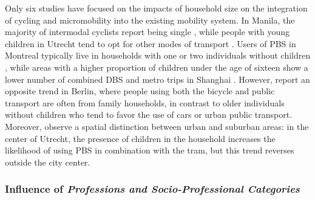 \begin{refsegment}
Only six studies have focused on the impacts of household size on the integration of cycling and micromobility into the existing mobility system. In Manila, the majority of intermodal cyclists report being single \textcolor{blue}{\autocite[246]{fillone_i_2018}}, while people with young children in Utrecht tend to opt for other modes of transport \textcolor{blue}{\autocite[272]{krygsman_multimodal_2004}}. Users of \acrshort{PBS} in Montreal typically live in households with one or two individuals without children \textcolor{blue}{\autocite[113]{bachand-marleau_much-anticipated_2011}}, while areas with a higher proportion of children under the age of sixteen show a lower number of combined \acrshort{DBS} and metro trips in Shanghai \textcolor{blue}{\autocite[11]{hu_examining_2022}}. However, \textcolor{blue}{\autocite[74]{oostendorp_combining_2018}} report an opposite trend in Berlin, where people using both the bicycle and public transport are often from family households, in contrast to older individuals without children who tend to favor the use of cars or urban public transport. Moreover, \textcolor{blue}{\autocite[299]{kuijk_preferences_2022}} observe a spatial distinction between urban and suburban areas: in the center of Utrecht, the presence of children in the household increases the likelihood of using \acrshort{PBS} in combination with the tram, but this trend reverses outside the city center.%

\subsubsection*{Influence of \textsl{Professions and Socio-Professional Categories}
    \label{chap2:pcs}
    }


\end{refsegment}
